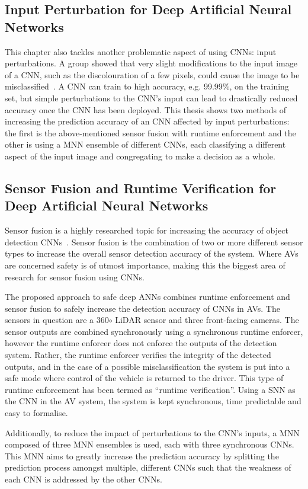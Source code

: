 \subsection{Input Perturbation for Deep Artificial Neural Networks}
This chapter also tackles another problematic aspect of using \acp{CNN}: input perturbations.
A group showed that very slight modifications to the input image of a \acf{CNN}, such as the discolouration of a few pixels, could cause the image to be misclassified~\cite{Gehr2018AI2SA, ann-pert}.
A \ac{CNN} can train to high accuracy, e.g. 99.99\%, on the training set, but simple perturbations to the \ac{CNN}'s input can lead to drastically reduced accuracy once the \ac{CNN} has been deployed.
This thesis shows two methods of increasing the prediction accuracy of an \ac{CNN} affected by input perturbations: the first is the above-mentioned sensor fusion with runtime enforcement and the other is using a \acf{MNN} ensemble of different \acp{CNN}, each classifying a different aspect of the input image and congregating to make a decision as a whole.


\subsection{Sensor Fusion and Runtime Verification for Deep Artificial Neural Networks}
Sensor fusion is a highly researched topic for increasing the accuracy of object detection \acp{CNN}~\cite{SensorFusion2017}. 
Sensor fusion is the combination of two or more different sensor types to increase the overall sensor detection accuracy of the system.
Where \acfp{AV} are concerned safety is of utmost importance, making this the biggest area of research for sensor fusion using \acp{CNN}.

The proposed approach to safe deep \acp{ANN} combines runtime enforcement and sensor fusion to safely increase the detection accuracy of \acp{CNN} in \acp{AV}.
The sensors in question are a 360$\circ$ \ac{LiDAR} sensor and three front-facing cameras.
The sensor outputs are combined synchronously using a synchronous runtime enforcer, however the runtime enforcer does not enforce the outputs of the detection system.
Rather, the runtime enforcer verifies the integrity of the detected outputs, and in the case of a possible misclassification the system is put into a safe mode where control of the vehicle is returned to the driver.
This type of runtime enforcement has been termed as ``runtime verification''.
Using a \acf{SNN} as the \ac{CNN} in the \ac{AV} system, the system is kept synchronous, time predictable and easy to formalise.

Additionally, to reduce the impact of perturbations to the \ac{CNN}'s inputs, a \ac{MNN} composed of three \ac{MNN} ensembles is used, each with three synchronous \acp{CNN}.
This \ac{MNN} aims to greatly increase the prediction accuracy by splitting the prediction process amongst multiple, different \acp{CNN} such that the weakness of each \ac{CNN} is addressed by the other \acp{CNN}.














